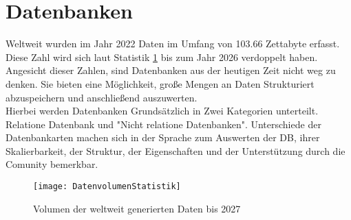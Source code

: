 \section{Datenbanken}
Weltweit wurden im Jahr 2022 Daten im Umfang von 103.66 Zettabyte erfasst. Diese Zahl wird sich laut Statistik \ref{fig:DatenvolumenStatistik} bis zum Jahr 2026 verdoppelt haben. Angesicht dieser Zahlen, sind Datenbanken aus der heutigen Zeit nicht weg zu denken. Sie bieten eine Möglichkeit, große Mengen an Daten Strukturiert abzuspeichern und anschließend auszuwerten.\\
Hierbei werden Datenbanken Grundsätzlich in Zwei Kategorien unterteilt. Relatione Datenbank und "Nicht relatione Datenbanken". Unterschiede der Datenbankarten machen sich in der Sprache zum Auswerten der DB, ihrer Skalierbarkeit, der Struktur, der Eigenschaften und der Unterstützung durch die Comunity bemerkbar. 
\begin{center}
    \begin{figure}[h]
     \centering
     \texttt{[image: DatenvolumenStatistik]}
     \caption{Volumen der weltweit generierten Daten bis 2027 \cite{Datenmengen}}
    \label{fig:DatenvolumenStatistik}
    \end{figure}
\end{center}
